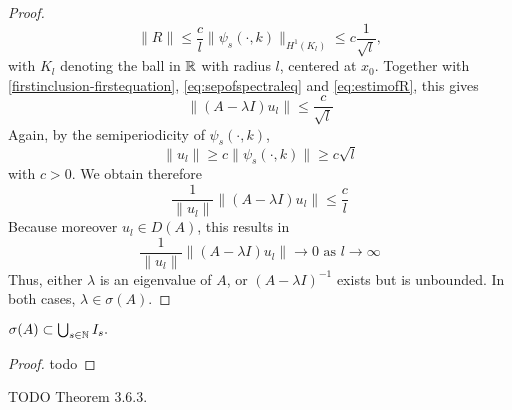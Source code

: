 \begin{theorem}
\begin{proof}
		\begin{equation}
			 \| R \| \leq \frac{c}{l} \| \psi_{s}(\cdot, k) \|_{H^{1}(K_{l})} \leq c \frac{1}{\sqrt{l}}, \label{eq:estimofR}
		\end{equation}
		with $K_{l}$ denoting the ball in $\mathbb{R}$ with radius $l$, centered at $x_{0}$. Together with \eqref{firstinclusion-firstequation}, \eqref{eq:sepofspectraleq} and \eqref{eq:estimofR}, this gives
		\[ \| (A - \lambda I) u_{l} \| \leq \frac{c}{\sqrt{l}} \]
		Again, by the semiperiodicity of $\psi_{s}(\cdot, k)$,
		\[ \| u_{l} \| \geq c \| \psi_{s}(\cdot, k) \| \geq c \sqrt{l} \]
		with $c > 0$. We obtain therefore
		\[ \frac{1}{\|u_{l}\|}\| (A - \lambda I) u_{l} \| \leq \frac{c}{l} \]
		Because moreover $u_{l} \in D(A)$, this results in
			\[ \frac{1}{\|u_{l} \|} \| (A - \lambda I) u_{l} \| \rightarrow 0 \text{ as } l \rightarrow \infty \]
		Thus, either $\lambda$ is an eigenvalue of $A$, or $(A - \lambda I)^{-1}$ exists but is unbounded. In both cases, $\lambda \in \sigma(A)$.
	\end{proof}
\end{theorem}	
	
\begin{theorem}
	$\sigma(A) \subset \bigcup_{s \in \mathbb{N}} I_{s}.$
\end{theorem}
\begin{proof}
	todo
\end{proof}
	
TODO 
	Theorem 3.6.3.
